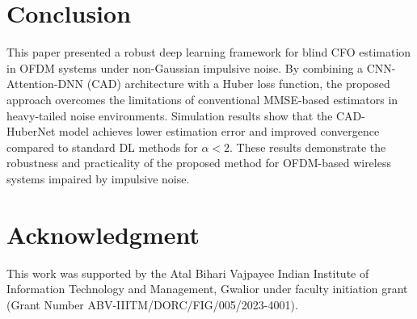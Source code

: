 \documentclass[10pt, journal]{IEEEtran}
\begin{document}
\section{Conclusion}
This paper presented a robust deep learning framework for blind CFO estimation in OFDM systems under non-Gaussian impulsive noise. By combining a CNN-Attention-DNN (CAD) architecture with a Huber loss function, the proposed approach overcomes the limitations of conventional MMSE-based estimators in heavy-tailed noise environments. Simulation results show that the CAD-HuberNet model achieves lower estimation error and improved convergence compared to standard DL methods for $\alpha < 2$. These results demonstrate the robustness and practicality of the proposed method for OFDM-based wireless systems impaired by impulsive noise.

\section*{Acknowledgment}
This work was supported by the Atal Bihari Vajpayee Indian Institute of Information Technology and Management, Gwalior under faculty initiation grant (Grant Number ABV-IIITM/DORC/FIG/005/2023-4001).


\balance

 
\end{document}
